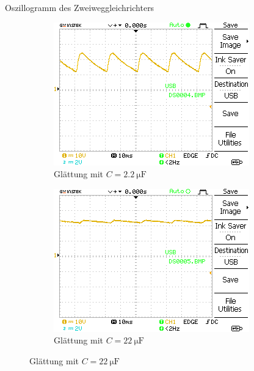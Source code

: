 \documentclass{article}
\theoremstyle{definition}
\begin{document}
\begin{aufgabe}{Oszillogramm des Zweiweggleichrichters}
\begin{figure}[H]
\begin{subfigure}[b]{0.49 \textwidth}
            \label{a3_a}
        \end{subfigure}
        \hfill
        \begin{subfigure}[b]{0.49 \textwidth}
            \includegraphics[width=\textwidth]{MesswerteVersuch2/DS0004.png}
            \caption{Glättung mit $C = \SI{2.2}{\micro\farad}$}
            \label{a3_b}
        \end{subfigure}
        \vspace{1em}
        \begin{subfigure}[b]{0.49 \textwidth}
            \includegraphics[width=\textwidth]{MesswerteVersuch2/DS0005.png}
            \caption{Glättung mit $C = \SI{22}{\micro\farad}$}
            \label{a3_c}
        \end{subfigure}

\end{figure}
\end{aufgabe}
\end{document}
